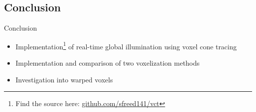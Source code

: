 \documentclass[10pt]{beamer}
\begin{document}



\subsection{Conclusion}
\begin{frame}{Conclusion}
  \begin{itemize}
    \item Implementation\footnote{Find the source here: \url{github.com/sfreed141/vct}} of real-time global illumination using voxel cone tracing
    \item Implementation and comparison of two voxelization methods
    \item Investigation into warped voxels
  \end{itemize}
\end{frame}
\end{document}
